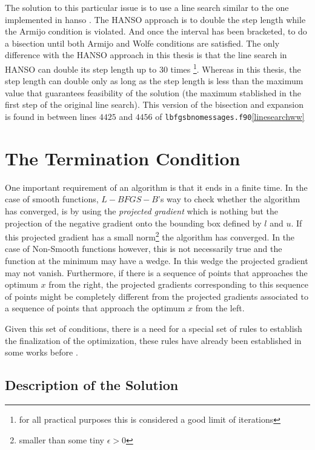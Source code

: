 The solution to this particular issue is to use a line search similar to the one implemented in hanso \citep{hanso}. The HANSO approach is to double the step length while the Armijo condition is violated. And once the interval has been bracketed, to do a bisection until both Armijo and Wolfe conditions are satisfied. The only difference with the HANSO approach in this thesis is that the line search in HANSO can double its step length up to $30$ times \footnote{for all practical purposes this is considered a good limit of iterations}. Whereas in this thesis, the step length can double only as long as the step length is less than the maximum value that guarantees feasibility of the solution (the maximum stablished in the first step of the original line search). This version of the bisection and expansion is found in between lines $4425$ and $4456$ of \texttt{lbfgsbnomessages.f90}\ref{linesearchww} 

\section{The Termination Condition}

One important requirement of an algorithm is that it ends in a finite time. In the case of smooth functions, $L-BFGS-B$'s way to check whether the algorithm has converged, is by using the \emph{projected gradient} which is nothing but the projection of the negative gradient onto the bounding box defined by $l$ and $u$. If this projected gradient has a small norm\footnote{smaller than some tiny $\epsilon > 0$} the algorithm has converged. In the case of Non-Smooth functions however, this is not necessarily true and the function at the minimum may have a wedge. In this wedge the projected gradient may not vanish. Furthermore, if there is a sequence of points that approaches the optimum $x$ from the right, the projected gradients corresponding to this sequence of points might be completely different from the projected gradients associated to a sequence of points that approach the optimum $x$ from the left.

Given this set of conditions, there is a need for a special set of rules to establish the finalization of the optimization, these rules have already been established in some works before\citep{overtonlewis} \citep{skajaa}.

\subsection{Description of the Solution}

